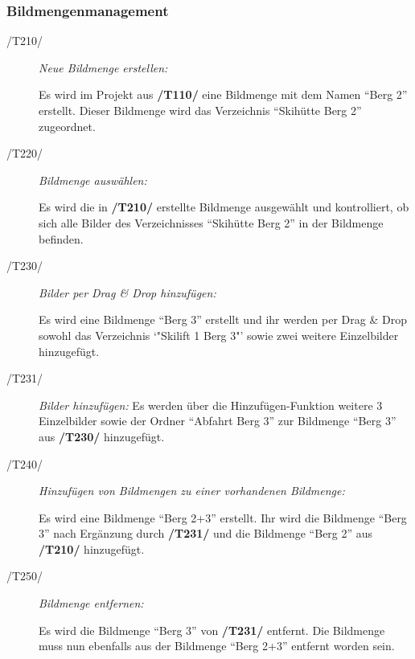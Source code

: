 	\subsubsection{Bildmengenmanagement}
		
		\begin{description}
		
			\item[/T210/] \textit{Neue Bildmenge erstellen:}\par Es wird im Projekt aus \textbf{/T110/} eine Bildmenge mit dem Namen "`Berg 2"' erstellt. Dieser Bildmenge wird das Verzeichnis "`Skihütte Berg 2"' zugeordnet.
				
			\item[/T220/] \textit{Bildmenge auswählen:}\par Es wird die in \textbf{/T210/} erstellte Bildmenge ausgewählt und kontrolliert, ob sich alle Bilder des Verzeichnisses "`Skihütte Berg 2"' in der Bildmenge befinden.

			\item[/T230/] \textit{Bilder per Drag \& Drop hinzufügen:}\par Es wird eine Bildmenge "`Berg 3"' erstellt und ihr werden per Drag \& Drop sowohl das Verzeichnis `"Skilift 1 Berg 3"' sowie zwei weitere Einzelbilder hinzugefügt.
			
			\item[/T231/] \textit{Bilder hinzufügen:} Es werden über die Hinzufügen-Funktion weitere 3 Einzelbilder sowie der Ordner "`Abfahrt Berg 3"' zur Bildmenge "`Berg 3"' aus \textbf{/T230/} hinzugefügt.
			
			\item[/T240/] \textit{Hinzufügen von Bildmengen zu einer vorhandenen Bildmenge:}\par Es wird eine Bildmenge "`Berg 2+3"' erstellt. Ihr wird die Bildmenge "`Berg 3"' nach Ergänzung durch \textbf{/T231/} und die Bildmenge "`Berg 2"' aus \textbf{/T210/} hinzugefügt.
				
			\item[/T250/] \textit{Bildmenge entfernen:}\par Es wird die Bildmenge "`Berg 3"' von \textbf{/T231/} entfernt. Die Bildmenge muss nun ebenfalls aus der Bildmenge "`Berg 2+3"' entfernt worden sein.
			

\end{description}
